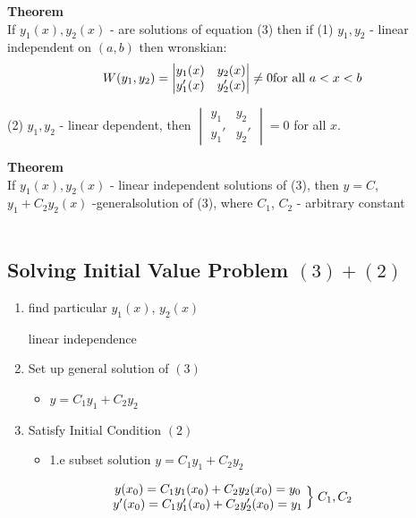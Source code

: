 \documentclass[10pt, letterpaper]{article}
\begin{document}
\textbf{Theorem}\\
If $y_1(x), y_2(x)$ - are solutions of equation (3) then if (1) $y_1, y_2$ - linear independent on $(a, b)$ then wronskian:
\begin{equation*}
W(y_1, y_2) =
\begin{vmatrix}
y_1(x) & y_2(x)\\
y_1'(x) & y_2'(x)
\end{vmatrix}
\neq 0
\\
\text{for all } a<x<b
\end{equation*}

(2) $y_1, y_2$ - linear dependent, then
$
\begin{vmatrix}
y_1 & y_2\\
y_1' & y_2'
\end{vmatrix}
=0$
for all $x$.

\textbf{Theorem}\\
If $y_1(x), y_2(x)$ - linear independent solutions of (3), then $y=C$, $y_1+C_2y_2(x)$ -generalsolution of (3), where $C_1$, $C_2$ - arbitrary constant\\
\\
\subsection{Solving Initial Value Problem $(3) + (2)$}
\begin{enumerate}
	\item find particular $y_1(x)$, $y_2(x)$
	\begin{itemize}
		linear independence
	\end{itemize}
	\item Set up general solution of $(3)$
	\begin{itemize}
		\item $y = C_1y_1 + C_2y_2$
	\end{itemize}
	\item Satisfy Initial Condition $(2)$
	\begin{itemize}
		\item 1.e subset solution $y=C_1y_1 + C_2y_2$
	\end{itemize}
\end{enumerate}

\begin{equation*}
\begin{matrix}
y(x_0) = C_1y_1(x_0) + C_2y_2(x_0) = y_0\\
y'(x_0) = C_1y_1'(x_0) + C_2y_2'(x_0) = y_1
\end{matrix}
\Bigm \} C_1, C_2
\end{equation*}
\end{document}
